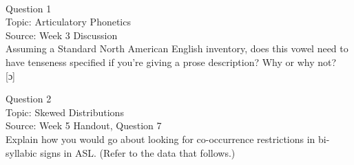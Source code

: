 \documentclass[12pt]{article}
\begin{document}
\newpage

\begin{center}
\textbf{{\color{red}{\HUGE END OF EXAM}}}\\

\end{center}
\newpage

\begin{center}
\textbf{{\color{blue}{\HUGE START OF EXAM\\}}}

\textbf{{\color{blue}{\HUGE Student ID: 94549\\}}}

\textbf{{\color{blue}{\HUGE 4:10\\}}}

\end{center}
\newpage

{\large Question 1}\\

Topic: Articulatory Phonetics\\
Source: Week 3 Discussion\\

Assuming a Standard North American English inventory, does this vowel need to have tenseness specified if you're giving a prose description? Why or why not?\\

{[ɔ]}


\newpage

{\large Question 2}\\

Topic: Skewed Distributions\\
Source: Week 5 Handout, Question 7\\

Explain how you would go about looking for co-occurrence restrictions in bi-syllabic signs in ASL. (Refer to the data that follows.)\\
\end{document}
